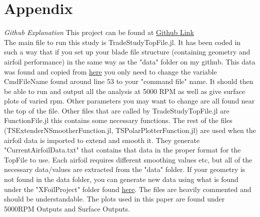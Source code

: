 \documentclass[12pt]{texmemo} %
\begin{document}
\newpage
\section{\textbf{Appendix}}

\vspace{5mm} %
\textit{Github Explanation}
This project can be found at \href{https://github.com/JacobChild/FlowLab_Onboarding/tree/main/TradeStudy}{Github Link}\\
The main file to run this study is TradeStudyTopFile.jl. It has been coded in such a way that if you set up your blade file structure (containing geometry and airfoil performance) in the same way as the "data" folder on my github. This data was found and copied from  \href{https://github.com/byuflowlab/FLOWUnsteady}{here} you only need to change the variable CmdFileName found around line 53 to your "command file" name. It should then be able to run and output all the analysis at 5000 RPM as well as give surface plots of varied rpm. Other parameters you may want to change are all found near the top of the file. Other files that are called by TradeStudyTopFile.jl are FunctionFile.jl this contains some necessary functions. The rest of the files (TSExtenderNSmootherFunction.jl, TSPolarPlotterFunction.jl) are used when the airfoil data is imported to extend and smooth it. They generate "CurrentAirfoilData.txt" that contains that data in the proper format for the TopFile to use. Each airfoil requires different smoothing values etc, but all of the necessary data/values are extracted from the "data" folder. If your geometry is not found in the data folder, you can generate new data using what is found under the "XFoilProject" folder found \href{https://github.com/JacobChild/FlowLab_Onboarding}{here}. The files are heavily commented and should be understandable.
The plots used in this paper are found under 5000RPM Outputs and Surface Outputs.
\end{document}
